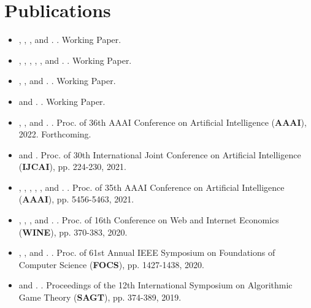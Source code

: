 \documentclass{article}
\newcommand{\link}[2]{\iftoggle{uselinks}{\href{#1}{#2}}{#2}\xspace}
\newcommand{\itlink}[2]{\link{https://daniel-halpern.com/files/#1.pdf}{\textit{#2}}}
\newcommand{\me}{\link{https://daniel-halpern.com}{D. Halpern}}
\newcommand{\nisarg}{\link{https://www.cs.toronto.edu/~nisarg}{N. Shah}}
\newcommand{\vasilis}{\link{https://www.cs.drexel.edu/~gkatz/}{V. Gkatzelis}}
\newcommand{\ariel}{\link{http://procaccia.info}{A. D. Procaccia}}
\newcommand{\alex}{\link{https://www.alexpsomas.com}{A. Psomas}}
\newcommand{\greg}{\link{https://gregorykehne.com}{G. Kehne}}
\newcommand{\dominik}{\link{https://dominik-peters.de}{D. Peters}}
\newcommand{\piotr}{\link{https://www.mimuw.edu.pl/~ps219737/}{P. Skowron}}
\newcommand{\manon}{\link{https://manrev.github.io/manon/}{M. Revel}}
\newcommand{\tao}{\link{https://tao-l.github.io}{T. Lin}}
\newcommand{\jamie}{\link{http://www.jamie.tuckerfoltz.com}{J. Tucker-Foltz}}
\newcommand{\dad}{\link{https://www.cs.cornell.edu/home/halpern/}{J. Y. Halpern}}
\newcommand{\ali}{\link{https://jadbabaie.mit.edu}{A. Jadbabaie}}
\newcommand{\elchanan}{\link{https://math.mit.edu/~elmos/}{E. Mossel}}
\newcommand{\allan}{\link{https://www.cs.toronto.edu/~bor/}{A. Borodin}}
\newcommand{\mohamad}{\link{https://www.cs.toronto.edu/~latifian/}{M. Latifian}}
\begin{document}
    \section{Publications}
    \begin{itemize}
        \setlength\itemsep{1.3ex}
        \item \allan, \me, \mohamad, and \nisarg. \itlink{distortion-top-t}{Distortion in Voting with Top-t Preferences}. Working Paper. 
        
        \item \me, \dad, \ali, \elchanan, \ariel, and \manon. \itlink{fluid-defense}{In Defense of Fluid Democracy}. Working Paper.
        
        \item \me, \greg, and \jamie. \itlink{buyers-reveal}{Can Buyers Reveal for a Better Deal?}. Working Paper.
        
        \item \me and \ariel. \itlink{unbiased-information}{Unbiased Information Packets}. Working Paper.
        
        \item \manon, \tao, and \me. \itlink{optimal-congress}{How Many Representatives Do We Need? The Optimal Size of an Epistemic Congress}.
        Proc. of 36th AAAI Conference on Artificial Intelligence (\textbf{AAAI}), 2022. Forthcoming. 
        
        \item \me and \nisarg \itlink{distortion-fair-division}{Fair and Efficient Resource Allocation with Partial Information}.
        Proc. of 30th International Joint Conference on Artificial Intelligence (\textbf{IJCAI}), pp. 224-230, 2021. 
        
        \item \me, \greg, \dominik, \ariel, \nisarg, and \piotr. \itlink{ranked-binary-judgments}{Aggregating Binary Judgments Ranked By Accuracy}.
        Proc. of 35th AAAI Conference on Artificial Intelligence (\textbf{AAAI}), pp. 5456-5463, 2021. 

        \item \me, \ariel, \alex, and \nisarg. \itlink{binary-mnw}{Fair Division with Binary Valuations: One
        Rule to Rule
        Them All}. Proc. of 16th Conference on Web and Internet Economics (\textbf{WINE}), pp. 370-383, 2020.
        
        \item \vasilis, \me, and \nisarg. \itlink{optimal-metric-distortion}{Resolving the Optimal Metric Distortion Conjecture}.
        Proc. of 61st Annual IEEE Symposium on Foundations of Computer Science (\textbf{FOCS}), pp. 1427-1438, 2020.

        \item \me and \nisarg. \itlink{fair-division-subsidy-full}{Fair Division with Subsidy}. Proceedings of the 12th International Symposium on
        Algorithmic Game Theory (\textbf{SAGT}), pp. 374-389, 2019.

    \end{itemize}
\end{document}

